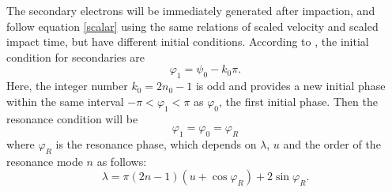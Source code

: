 \documentclass[a4paper,11pt]{article}
\begin{document}
The secondary electrons will be immediately generated after impaction, and follow equation \eqref{scalar} using the same relations of scaled velocity and scaled impact time, but have different initial conditions. According to \cite{PP}, the initial condition for secondaries are
\begin{equation}
\varphi_1=\psi_0-k_0\pi.\label{ini_imp}
\end{equation}
Here, the integer number $k_0=2n_0-1$ is odd and provides a new initial phase within the same interval $-\pi<\varphi_1<\pi$ as $\varphi_0$, the first initial phase. Then the resonance condition will be \cite{PP}
\begin{equation}
\varphi_1=\varphi_0=\varphi_R\label{res}
\end{equation}
where $\varphi_R$ is the resonance phase, which depends on $\lambda$, $u$ and the order of the resonance mode $n$ as follows:
\begin{equation}
\lambda=\pi(2n-1)(u+\cos\varphi_R)+2\sin\varphi_R.\label{mode}
\end{equation}
\end{document}
